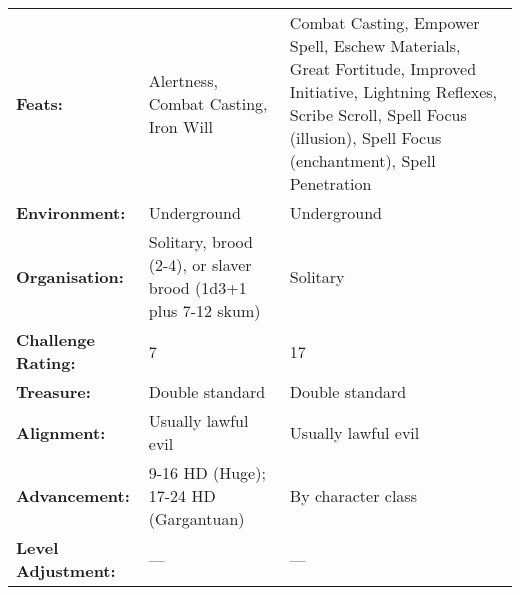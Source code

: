 \documentclass[../main.tex]{subfiles}
\begin{document}
\begin{table}[]
\begin{tabular}{p{9em}p{16em}p{20em}}
\textbf{Feats:} & Alertness, Combat Casting, Iron Will & Combat Casting, Empower Spell, Eschew Materials, Great Fortitude, Improved Initiative, Lightning Reflexes, Scribe Scroll, Spell Focus (illusion), Spell Focus (enchantment), Spell Penetration \\
\rowcolor[HTML]{FFCE93} 
\textbf{Environment:} & Underground & Underground \\
\textbf{Organisation:} & Solitary, brood (2-4), or slaver brood (1d3+1 plus 7-12 skum) & Solitary \\
\rowcolor[HTML]{FFCE93} 
\textbf{Challenge Rating:} & 7 & 17 \\
\textbf{Treasure:} & Double standard & Double standard \\
\rowcolor[HTML]{FFCE93} 
\textbf{Alignment:} & Usually lawful evil & Usually lawful evil \\
\textbf{Advancement:} & 9-16 HD (Huge); 17-24 HD (Gargantuan) & By character class \\
\rowcolor[HTML]{FFCE93} 
\textbf{Level Adjustment:} & --- & ---
\end{tabular}
\end{table}
\end{document}
